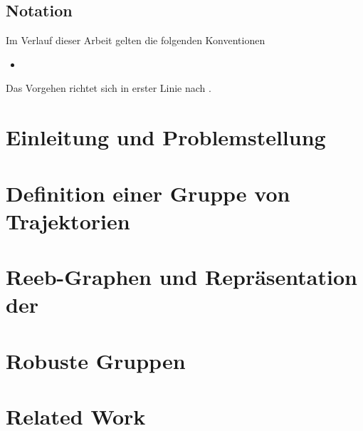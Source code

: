 




\tableofcontents

\section*{Notation}
Im Verlauf dieser Arbeit gelten die folgenden Konventionen
\begin{itemize}
	\item 
\end{itemize}
Das Vorgehen richtet sich in erster Linie nach \textcite{buchin2015}.
\cleardoubleoddemptypage
{}
\setcounter{page}{1}
\setcounter{footnote}{0}

\chapter{Einleitung und Problemstellung} %
\label{cha:einleitung}


\chapter{Definition einer Gruppe von Trajektorien} %
\label{cha:def_gruppe}


\chapter{Reeb-Graphen und Repräsentation der \GrpStruktur} %
\label{cha:reeb_graphen}


\chapter{Robuste Gruppen} %
\label{cha:robust}


\chapter{Related Work} %
\label{cha:related_work}







